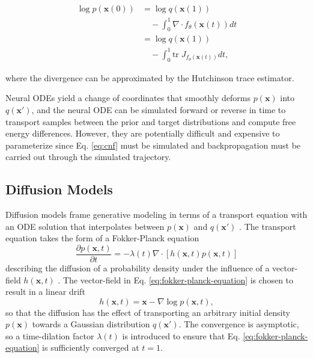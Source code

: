 \documentclass[%
 aip,
 amsmath,amssymb,
 reprint,%
]{revtex4-1}
\begin{document}
\begin{equation}
    \label{eq:cnf-free-energy}
    \begin{aligned}
        \log p(\mathbf{x}(0)) &= \log q(\mathbf{x}(1)) \\
        &\quad - \int_0^1 \nabla \cdot 
        f_\theta(\mathbf{x}(t)) dt \\
        &= \log q(\mathbf{x}(1)) \\
        &\quad - \int_0^1
        \mathrm{tr}\;  J_{f_\theta(\mathbf{x}(t))} dt,
    \end{aligned}
\end{equation}

where the divergence can be approximated by the Hutchinson trace estimator\cite{hutchinson1989stochastic}.

Neural ODEs yield a change of coordinates that smoothly deforms $p(\mathbf{x})$ into $q(\mathbf{x}')$, and the neural ODE can be simulated forward or reverse in time to transport samples between the prior and target distributions and compute free energy differences. However, they are potentially difficult and expensive to parameterize since Eq. \ref{eq:cnf} must be simulated and backpropagation must be carried out through the simulated trajectory\cite{CNF}.

\subsection{Diffusion Models}
\label{sec:sgm}
Diffusion models frame generative modeling in terms of a transport equation with an ODE solution that interpolates between $p(\mathbf{x})$ and $q(\mathbf{x}')$ \cite{nonequilibrium-learning,ddpm,score-based-generative,FPE-probability-flow}. The transport equation takes the form of a Fokker-Planck equation
\begin{equation}
    \label{eq:fokker-planck-equation}
    \frac{\partial p(\mathbf{x},t)}{\partial t} = -\lambda(t) \nabla \cdot \left[h(\mathbf{x},t)p(\mathbf{x},t)\right]
\end{equation}
describing the diffusion of a probability density under the influence of a vector-field $h(\mathbf{x},t)$ \cite{FPE-probability-flow}. 
The vector-field in Eq. \ref{eq:fokker-planck-equation} is chosen to result in a linear drift
\begin{equation}
    \label{eq:drift}
    h(\mathbf{x},t) = \mathbf{x} - \nabla \log p(\mathbf{x},t),
\end{equation}
so that the diffusion has the effect of transporting an arbitrary initial density $p(\mathbf{x})$ towards a Gaussian distribution $q(\mathbf{x}')$. The convergence is asymptotic, so a time-dilation factor $\lambda(t)$ is introduced to ensure that Eq. \ref{eq:fokker-planck-equation} is sufficiently converged at $t=1$.
\end{document}
